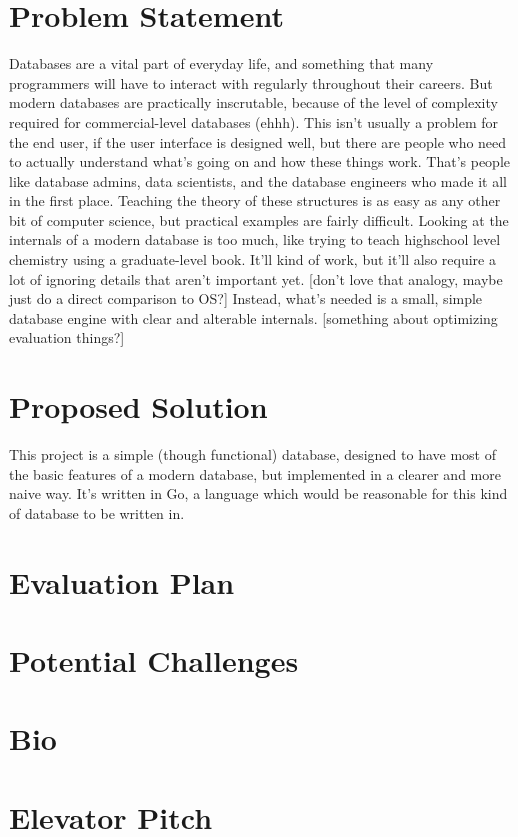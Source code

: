 \documentclass[12pt, oneside]{amsart} %
\begin{document}
\section{Problem Statement}
Databases are a vital part of everyday life, and something that many programmers will have to interact with regularly throughout their careers. But modern databases are practically inscrutable, because of the level of complexity required for commercial-level databases (ehhh). This isn't usually a problem for the end user, if the user interface is designed well, but there are people who need to actually understand what's going on and how these things work. That's people like database admins, data scientists, and the database engineers who made it all in the first place. Teaching the theory of these structures is as easy as any other bit of computer science, but practical examples are fairly difficult. Looking at the internals of a modern database is too much, like trying to teach highschool level chemistry using a graduate-level book. It'll kind of work, but it'll also require a lot of ignoring details that aren't important yet. [don't love that analogy, maybe just do a direct comparison to OS?] Instead, what's needed is a small, simple database engine with clear and alterable internals. [something about optimizing evaluation things?]


\section{Proposed Solution}

This project is a simple (though functional) database, designed to have most of the basic features of a modern database, but implemented in a clearer and more naive way. It's written in Go, a language which would be reasonable for this kind of database to be written in. 

\section{Evaluation Plan}


\section{Potential Challenges}

\section{Bio}

\section{Elevator Pitch}
\end{document}
